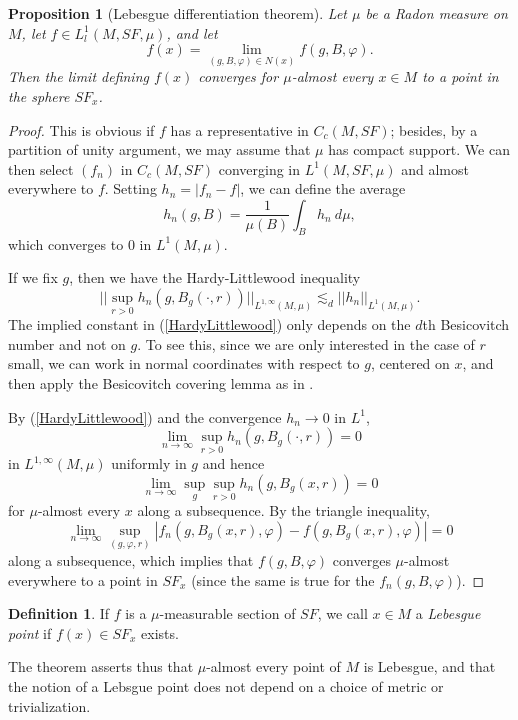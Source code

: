 \documentclass[reqno,12pt,letterpaper]{amsart}
\newcommand{\dfn}[1]{\emph{#1}\index{#1}}
\newtheorem{proposition}[theorem]{Proposition}
\theoremstyle{definition}
\newtheorem{definition}[theorem]{Definition}
\numberwithin{equation}{section}
\begin{document}
\begin{proposition}[Lebesgue differentiation theorem]
Let $\mu$ be a Radon measure on $M$, let $f \in L^1_l(M, SF, \mu)$, and let
$$f(x) = \lim_{(g, B, \varphi) \in N(x)} f(g, B, \varphi).$$
Then the limit defining $f(x)$ converges for $\mu$-almost every $x \in M$ to a point in the sphere $SF_x$.
\end{proposition}
\begin{proof}
This is obvious if $f$ has a representative in $C_c(M, SF)$; besides, by a partition of unity argument, we may assume that $\mu$ has compact support.
We can then select $(f_n)$ in $C_c(M, SF)$ converging in $L^1(M, SF, \mu)$ and almost everywhere to $f$.
Setting $h_n = |f_n - f|$, we can define the average
$$h_n(g, B) = \frac{1}{\mu(B)} \int_B h_n ~d\mu,$$
which converges to $0$ in $L^1(M, \mu)$.

If we fix $g$, then we have the Hardy-Littlewood inequality
\begin{equation}\label{HardyLittlewood}
||\sup_{r > 0} h_n(g, B_g(\cdot, r))||_{L^{1, \infty}(M, \mu)} \lesssim_d ||h_n||_{L^1(M, \mu)}.
\end{equation}
The implied constant in (\ref{HardyLittlewood}) only depends on the $d$th Besicovitch number and not on $g$.
To see this, since we are only interested in the case of $r$ small, we can work in normal coordinates with respect to $g$, centered on $x$, and then apply the Besicovitch covering lemma as in \cite[Lemma 4.1.1a]{Ledrappier85}.

By (\ref{HardyLittlewood}) and the convergence $h_n \to 0$ in $L^1$,
$$\lim_{n \to \infty} \sup_{r > 0} h_n(g, B_g(\cdot, r)) = 0$$
in $L^{1, \infty}(M, \mu)$ uniformly in $g$ and hence
$$\lim_{n \to \infty} \sup_g \sup_{r > 0} h_n(g, B_g(x, r)) = 0$$
for $\mu$-almost every $x$ along a subsequence. By the triangle inequality,
$$\lim_{n \to \infty} \sup_{(g, \varphi, r)} |f_n(g, B_g(x, r), \varphi) - f(g, B_g(x, r), \varphi)| = 0$$
along a subsequence, which implies that $f(g, B, \varphi)$ converges $\mu$-almost everywhere to a point in $SF_x$ (since the same is true for the $f_n(g, B, \varphi)$).
\end{proof}

\begin{definition}
If $f$ is a $\mu$-measurable section of $SF$, we call $x \in M$ a \dfn{Lebesgue point} if $f(x) \in SF_x$ exists.
\end{definition}

The theorem asserts thus that $\mu$-almost every point of $M$ is Lebesgue, and that the notion of a Lebsgue point does not depend on a choice of metric or trivialization.
\end{document}
